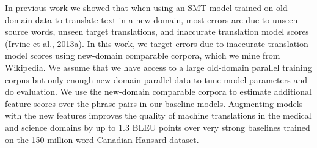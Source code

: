 In previous work we showed that when using an SMT model trained on old-domain data to translate text in a new-domain, most errors are due to unseen source words, unseen target translations, and inaccurate translation model scores (Irvine et al., 2013a). In this work, we target errors due to inaccurate translation model scores using new-domain comparable corpora, which we mine from Wikipedia. We assume that we have access to a large old-domain parallel training corpus but only enough new-domain parallel data to tune model parameters and do evaluation. We use the new-domain comparable corpora to estimate additional feature scores over the phrase pairs in our baseline models. Augmenting models with the new features improves the quality of machine translations in the medical and science domains by up to 1.3 BLEU points over very strong baselines trained on the 150 million word Canadian Hansard dataset.
